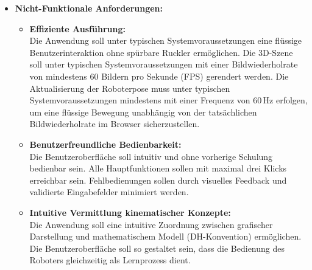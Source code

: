 \begin{itemize}
\begin{itemize}
        \item \textbf{Bewegung im lokalen und globalen Koordinatensystem:} \\
        Die Steuerung des TCP soll sowohl im lokalen Werkzeugkoordinatensystem, als auch im globalen Weltkoordinatensystem erfolgen können. Eine Umschaltung zwischen diesen Modi soll möglich sein.

        \item \textbf{Manuelle Konfiguration der Gelenkwinkel:} \\
        Über interaktive Schieberegler (Slider) soll der Nutzer die Gelenkwinkel des Roboters direkt beeinflussen können.
        Änderungen der Konfiguration sollen unmittelbar in der Visualisierung sichtbar werden,
        wobei die aktuelle Position des Endeffektors kontinuierlich anhand der Vorwärtstransformation berechnet wird.
    \end{itemize}

    \item \textbf{Nicht-Funktionale Anforderungen:}
        \begin{itemize}
        \item \textbf{Effiziente Ausführung:} \\
        Die Anwendung soll unter typischen Systemvoraussetzungen eine flüssige Benutzerinteraktion ohne spürbare Ruckler ermöglichen.
        Die 3D-Szene soll unter typischen Systemvoraussetzungen mit einer Bildwiederholrate von mindestens 60 Bildern pro Sekunde (FPS) gerendert werden.
        Die Aktualisierung der Roboterpose muss unter typischen Systemvoraussetzungen mindestens mit einer Frequenz von 60\,Hz erfolgen,
        um eine flüssige Bewegung unabhängig von der tatsächlichen Bildwiederholrate im Browser sicherzustellen.

        \item \textbf{Benutzerfreundliche Bedienbarkeit:} \\
        Die Benutzeroberfläche soll intuitiv und ohne vorherige Schulung bedienbar sein.
        Alle Hauptfunktionen sollen mit maximal drei Klicks erreichbar sein.
        Fehlbedienungen sollen durch visuelles Feedback und validierte Eingabefelder minimiert werden.

        \item \textbf{Intuitive Vermittlung kinematischer Konzepte:} \\
        Die Anwendung soll eine intuitive Zuordnung zwischen grafischer Darstellung und mathematischem Modell (DH-Konvention) ermöglichen.
        Die Benutzeroberfläche soll so gestaltet sein, dass die Bedienung des Roboters gleichzeitig als Lernprozess dient.
        \end{itemize}
\end{itemize}





